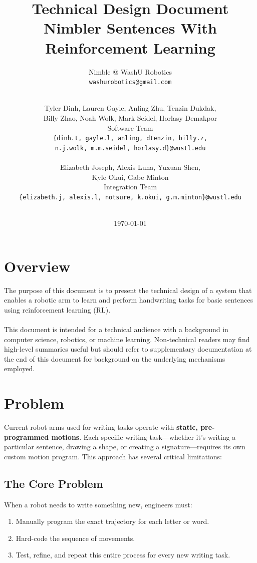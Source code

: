 \documentclass[12pt,a4paper]{article}
\title{\textbf{Technical Design Document}\\[0.5em]\large Nimbler Sentences With Reinforcement Learning}
\author{Nimble @ WashU Robotics \\ \texttt{washurobotics@gmail.com}}
\author{
    \\
    Tyler Dinh, Lauren Gayle, Anling Zhu, Tenzin Dukdak, \\
    Billy Zhao, Noah Wolk, Mark Seidel, Horlasy Demakpor \\[0.3em]
    Software Team \\[0.2em]
    \texttt{\{dinh.t, gayle.l, anling, dtenzin, billy.z,} \\
    \texttt{n.j.wolk, m.m.seidel, horlasy.d\}@wustl.edu} \\\\
    Elizabeth Joseph, Alexis Luna, Yuxuan Shen, \\
    Kyle Okui, Gabe Minton \\[0.3em]
    Integration Team \\[0.2em]
    \texttt{\{elizabeth.j, alexis.l, notsure, k.okui, g.m.minton\}@wustl.edu}\\\\
}
\date{\today}
\begin{document}
\maketitle
\newpage
\tableofcontents
\newpage

\section{Overview}
The purpose of this document is to present the technical design of a system that enables a robotic arm to learn and perform handwriting tasks for basic sentences using reinforcement learning (RL). \\\\
This document is intended for a technical audience with a background in computer science, robotics, or machine learning. Non-technical readers may find high-level summaries useful but should refer to supplementary documentation at the end of this document for background on the underlying mechanisms employed.
\newpage
\section{Problem}

Current robot arms used for writing tasks operate with \textbf{static, pre-programmed motions}. Each specific writing task---whether it's writing a particular sentence, drawing a shape, or creating a signature---requires its own custom motion program. This approach has several critical limitations:

\subsection{The Core Problem}

When a robot needs to write something new, engineers must:
\begin{enumerate}
    \item Manually program the exact trajectory for each letter or word.
    \item Hard-code the sequence of movements.
    \item Test, refine, and repeat this entire process for every new writing task.
\end{enumerate}
\end{document}
